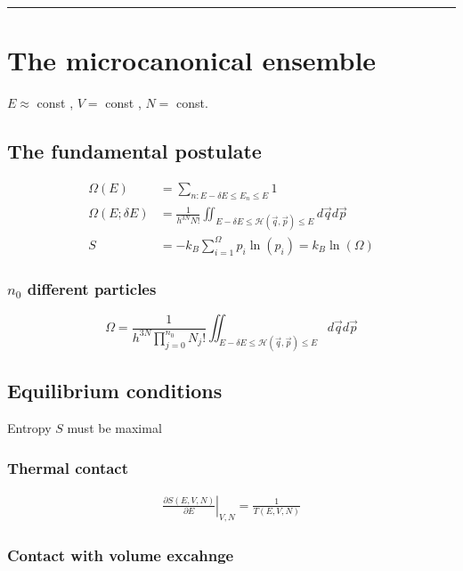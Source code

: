 \noindent\rule[1ex]{\textwidth/5}{1pt}
\section{The microcanonical ensemble}
$E \approx$ const , $V=$ const , $N=$ const.

\subsection*{The fundamental postulate}

\begin{equation*}
    \begin{aligned}
        \Omega(E) &= \sum_{n: E- \delta E \leq E_n \leq E} 1 \\
        \Omega(E; \delta E) &= \frac{1}{h^{3N} N!}  \iint_{E- \delta E \leq \mathcal{H}(\vec{q}, \vec{p}) \leq E} d \vec{q} d \vec{p} \\
        S &= -k_B \sum_{i=1}^\Omega p_i \ln (p_i) = k_B \ln (\Omega)
    \end{aligned}
\end{equation*}

\subsubsection*{$n_0$ different particles}
\begin{equation*}
    \Omega = \frac{1}{h^{3N} \prod_{j=0}^{n_0}N_j!}  \iint_{E- \delta E \leq \mathcal{H}(\vec{q}, \vec{p}) \leq E} d \vec{q} d \vec{p}
\end{equation*}

\subsection*{Equilibrium conditions}
Entropy $S$ must be maximal

\subsubsection*{Thermal contact}
\begin{equation*}
    \begin{aligned}
        \left. \frac{\partial S (E,V,N)}{\partial E} \right|_{V,N} = \frac{1}{T(E,V,N)}
    \end{aligned}
\end{equation*}

\subsubsection*{Contact with volume excahnge}

